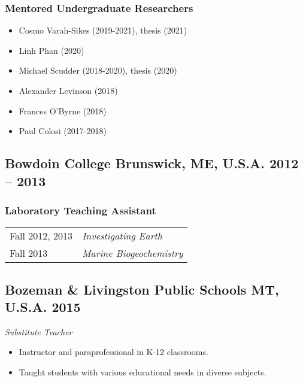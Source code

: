 \subsubsection*{Mentored Undergraduate Researchers}
\begin{itemize}
	\item Cosmo Varah-Sikes (2019-2021), thesis (2021)
	\item Linh Phan (2020)
	\item Michael Scudder (2018-2020), thesis (2020)
	\item Alexander Levinson (2018)
	\item Frances O'Byrne (2018)
	\item Paul Colosi (2017-2018)
\end{itemize}

\subsection*{\textbf{Bowdoin College} \hspace{15pt} Brunswick, ME, U.S.A. \hfill 2012 – 2013}
\subsubsection*{Laboratory Teaching Assistant}
\begin{tabular}{p{.15\linewidth} p{.85\linewidth}} %
Fall 2012, 2013 & \textit{Investigating Earth}\\
Fall 2013 & \textit{Marine Biogeochemistry}
\end{tabular}

\subsection*{\textbf{Bozeman \& Livingston Public Schools} \hspace{15pt} MT, U.S.A. \hfill 2015}
\textit{Substitute Teacher}
\begin{itemize}
	\item Instructor and paraprofessional in K-12 classrooms.
	\item Taught students with various educational needs in diverse subjects.
\end{itemize}